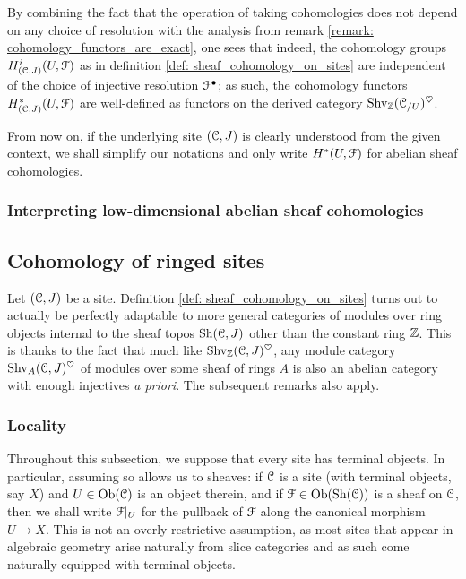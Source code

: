             \begin{remark} \label{remark: resolution_independence_of_cohomology_functors}
                By combining the fact that the operation of taking cohomologies does not depend on any choice of resolution with the analysis from remark \ref{remark: cohomology_functors_are_exact}, one sees that indeed, the cohomology groups $H^i_{(\mathcal{C}, J)}(U, \mathcal{F})$ as in definition \ref{def: sheaf_cohomology_on_sites} are independent of the choice of injective resolution $\mathcal{F}^{\bullet}$; as such, the cohomology functors $H^*_{(\mathcal{C}, J)}(U, \mathcal{F})$ are well-defined as functors on the derived category $\mathrm{Shv}_{\mathbb{Z}}(\mathcal{C}_{/U})^{\heartsuit}$. 
            \end{remark}
            \begin{convention}
                From now on, if the underlying site $(\mathcal{C}, J)$ is clearly understood from the given context, we shall simplify our notations and only write $H^*(U, \mathcal{F})$ for abelian sheaf cohomologies.
            \end{convention}
            
        \subsubsection{Interpreting low-dimensional abelian sheaf cohomologies}
            
    \subsection{Cohomology of ringed sites}
        \begin{remark}
            Let $(\mathcal{C}, J)$ be a site. Definition \ref{def: sheaf_cohomology_on_sites} turns out to actually be perfectly adaptable to more general categories of modules over ring objects internal to the sheaf topos $\mathrm{Sh}(\mathcal{C}, J)$ other than the constant ring $\mathbb{Z}$. This is thanks to the fact that much like $\mathrm{Shv}_{\mathbb{Z}}(\mathcal{C}, J)^{\heartsuit}$, any module category $\mathrm{Shv}_A(\mathcal{C}, J)^{\heartsuit}$ of modules over some sheaf of rings $A$ is also an abelian category with enough injectives \textit{a priori}. The subsequent remarks also apply. 
        \end{remark}
        
        \subsubsection{Locality}
            \begin{convention}
                Throughout this subsection, we suppose that every site has terminal objects. In particular, assuming so allows us to  sheaves: if $\mathcal{C}$ is a site (with terminal objects, say $X$) and $U \in \mathrm{Ob}(\mathcal{C})$ is an object therein, and if $\mathcal{F} \in \mathrm{Ob}(\mathrm{Sh}(\mathcal{C}))$ is a sheaf on $\mathcal{C}$, then we shall write $\mathcal{F}|_U$ for the pullback of $\mathcal{F}$ along the canonical morphism $U \to X$. This is not an overly restrictive assumption, as most sites that appear in algebraic geometry arise naturally from slice categories and as such come naturally equipped with terminal objects. 
            \end{convention}
            
